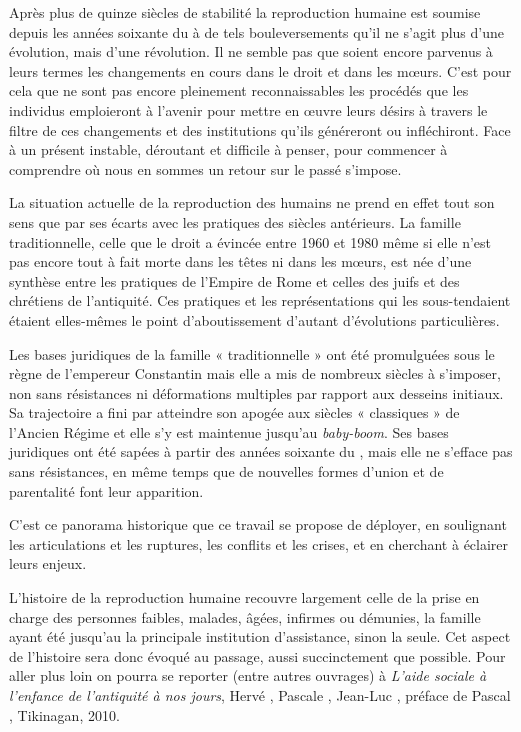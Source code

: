 Après plus de quinze siècles de stabilité la reproduction humaine
est soumise depuis les années soixante du  à de tels bouleversements
qu'il ne s'agit plus d'une évolution, mais d'une révolution. Il
ne semble pas que soient encore  parvenus à leurs termes les changements en
cours dans le droit et dans les mœurs. C'est pour cela que ne sont pas
encore pleinement reconnaissables les procédés que les individus emploieront
à l'avenir pour mettre en œuvre leurs désirs à travers le filtre
de ces changements et des institutions qu'ils généreront ou infléchiront.
Face à un présent instable, déroutant et difficile à penser, pour commencer à
comprendre où nous en sommes
 un retour sur le passé s'impose.

La situation actuelle de la reproduction des humains ne prend en
effet tout son sens que par ses écarts avec les pratiques des siècles antérieurs.
La famille traditionnelle, celle que le droit a évincée entre 1960 et
1980 même si elle n'est pas encore tout à fait morte dans les têtes ni dans les mœurs, est
née d'une synthèse entre les pratiques de l'Empire de Rome et celles des
juifs et des chrétiens de l'antiquité. Ces pratiques et les représentations
qui les sous-tendaient étaient elles-mêmes le point d'aboutissement
d'autant d'évolutions particulières.

Les bases juridiques de la famille « traditionnelle » ont été promulguées sous le règne
de l'empereur Constantin mais elle a mis de nombreux
siècles à s'imposer, non sans résistances ni déformations multiples par
rapport aux desseins initiaux. Sa trajectoire a fini par atteindre son apogée aux
siècles « classiques » de l'Ancien Régime et elle s'y est maintenue jusqu'au
\emph{baby-boom}. Ses bases juridiques ont été sapées à partir des années soixante du , mais elle ne s'efface pas sans résistances, en même temps que de nouvelles formes d'union et de parentalité font leur apparition.

C'est ce panorama historique que ce travail se propose de déployer, en soulignant les articulations et les ruptures, les
conflits et les crises, et en cherchant à éclairer leurs enjeux.

L'histoire de la reproduction humaine recouvre largement celle
de la prise en charge des personnes faibles, malades, âgées, infirmes ou
démunies, la famille ayant été jusqu'au  la principale institution
d'assistance, sinon la seule. Cet aspect de l'histoire sera donc évoqué
au passage, aussi succinctement que possible. Pour aller plus loin on
pourra se reporter (entre autres ouvrages) à \emph{L'aide sociale à l'enfance de l'antiquité à
nos jours}, Hervé , Pascale , Jean-Luc ,
préface de Pascal , Tikinagan, 2010.

